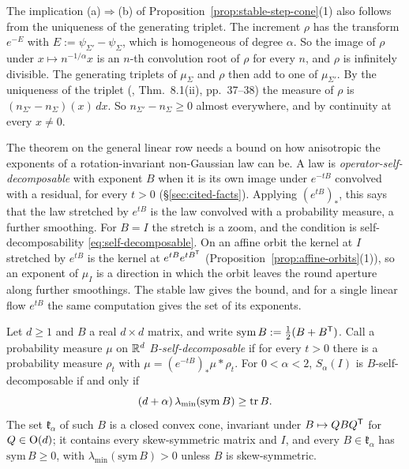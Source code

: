 \begin{remark}\label{rem:stable-step-sato}
The implication (a)$\Rightarrow$(b) of Proposition~\ref{prop:stable-step-cone}(1) also follows from the
uniqueness of the generating triplet. The increment $\rho$ has the transform $e^{-E}$ with
$E := \psi_{\Sigma'} - \psi_\Sigma$, which is homogeneous of degree $\alpha$. So the image of $\rho$
under $x \mapsto n^{-1/\alpha}x$ is an $n$-th convolution root of $\rho$ for every $n$, and $\rho$ is
infinitely divisible. The generating triplets of $\mu_\Sigma$ and $\rho$ then add to one of
$\mu_{\Sigma'}$. By the uniqueness of the triplet (, Thm.~8.1(ii), pp.~37--38) the
\Levy{} measure of $\rho$ is $(n_{\Sigma'} - n_\Sigma)(x)\,dx$. So $n_{\Sigma'} - n_\Sigma \ge 0$
almost everywhere, and by continuity at every $x \ne 0$.
\end{remark}

The theorem on the general linear row needs a bound on how anisotropic the exponents of a
rotation-invariant non-Gaussian law can be. A law is \emph{operator-self-decomposable} with exponent
$B$ when it is its own image under $e^{-tB}$ convolved with a residual, for every $t > 0$
(\S\ref{sec:cited-facts}). Applying $(e^{tB})_*$, this says that the law stretched by $e^{tB}$ is the
law convolved with a probability measure, a further smoothing. For $B = I$ the stretch is a zoom, and
the condition is self-decomposability \ref{eq:self-decomposable}. On an affine orbit the kernel at $I$
stretched by $e^{tB}$ is the kernel at $e^{tB}e^{tB^{\mathsf{T}}}$ (Proposition~\ref{prop:affine-orbits}(1)),
so an exponent of $\mu_I$ is a direction in which the orbit leaves the round aperture along further
smoothings. The stable law gives the bound, and for a single linear flow $e^{tB}$ the same computation
gives the set of its exponents.

\begin{proposition}\label{prop:stable-exponent-cone}
Let $d \ge 1$ and $B$ a real $d \times d$ matrix, and write $\mathrm{sym}\,B := \tfrac12(B + B^{\mathsf{T}})$.
Call a probability measure $\mu$ on $\mathbb{R}^d$ \emph{$B$-self-decomposable} if for every $t > 0$ there is a
probability measure $\rho_t$ with $\mu = (e^{-tB})_*\mu * \rho_t$. For $0 < \alpha < 2$, $S_\alpha(I)$
is $B$-self-decomposable if and only if
\begin{equation}\label{eq:stable-exponent-cone}
  (d+\alpha)\,\lambda_{\min}(\mathrm{sym}\,B) \ge \operatorname{tr} B .
\end{equation}
The set $\mathfrak k_\alpha$ of such $B$ is a closed convex cone, invariant under $B \mapsto QBQ^{\mathsf{T}}$ for
$Q \in \mathrm{O}(d)$; it contains every skew-symmetric matrix and $I$, and every $B \in \mathfrak k_\alpha$ has
$\mathrm{sym}\,B \ge 0$, with $\lambda_{\min}(\mathrm{sym}\,B) > 0$ unless $B$ is skew-symmetric.
\end{proposition}


